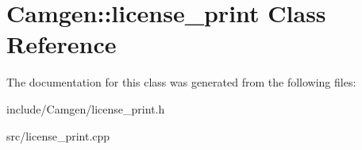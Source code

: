 \hypertarget{a00328}{}\section{Camgen\+:\+:license\+\_\+print Class Reference}
\label{a00328}


The documentation for this class was generated from the following files\+:\begin{DoxyCompactItemize}
\item 
include/\+Camgen/license\+\_\+print.\+h\item 
src/license\+\_\+print.\+cpp\end{DoxyCompactItemize}
